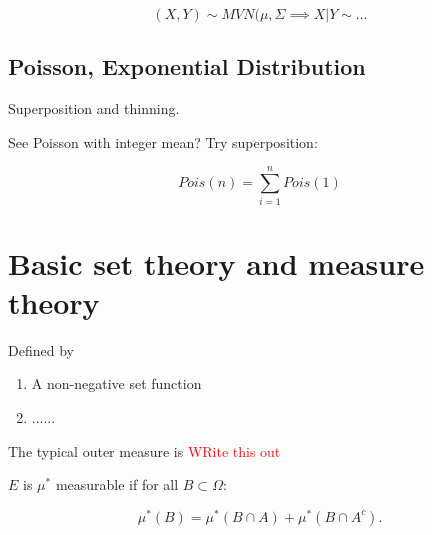 \documentclass{article}
\newcommand\myworries[1]{\textcolor{red}{#1}}
\begin{document}
\begin{fact}
	$$(X,Y) \sim MVN(\mu, \Sigma \implies X|Y \sim \ldots $$
\end{fact}

\subsection{Poisson, Exponential Distribution}
Superposition and thinning.

\begin{fact}[Superposition]
	See Poisson with integer mean? Try superposition:
	
	$$Pois(n) = \sum_{i=1}^n Pois(1)$$
\end{fact}

\begin{fact}
	
\end{fact}
\begin{fact}
	
\end{fact}


\section{Basic set theory and measure theory}
\begin{definition}
\end{definition}
\begin{definition}
\end{definition}





\begin{definition}
Defined by 
\begin{enumerate}
	\item A non-negative set function 
	\item ......
\end{enumerate}
The typical outer measure is 
\myworries{WRite this out}
\end{definition}

\begin{definition}
$E$ is $\mu^*$ measurable if for all $B\subset \Omega$:

$$\mu^* (B) = \mu^*(B\cap A) + \mu^*(B \cap A^c).$$
\end{definition}
\end{document}
